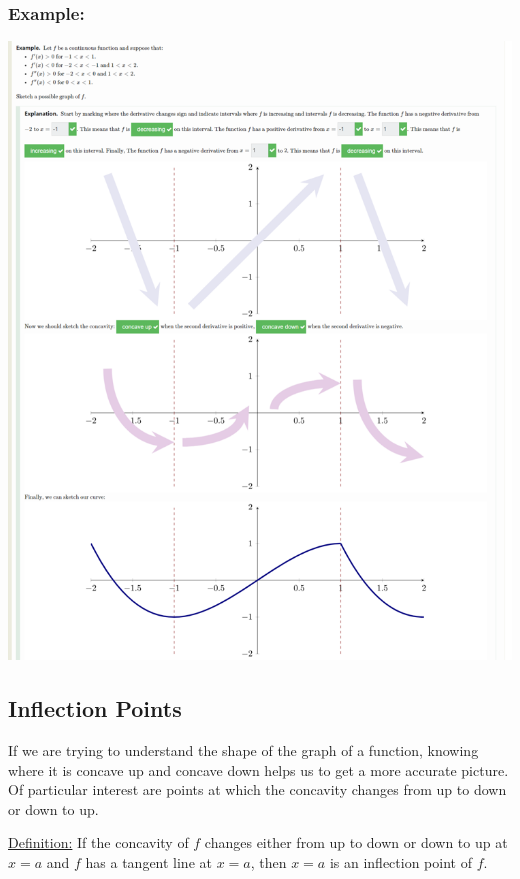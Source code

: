 \documentclass{article}
\begin{document}
\subsubsection*{Example:}
\begin{center}
\begin{minipage}{\linewidth}
    \centering
    \includegraphics[width=1.3\textwidth]{imgs/ex.png}
\end{minipage}
\end{center}

\newpage 
\subsection{Inflection Points}
If we are trying to understand the shape of the graph of a function, knowing where it is concave up and concave down helps us to get a more accurate picture. Of particular interest are points at which the concavity changes from up to down or down to up.

\begin{tcolorbox}[sharp corners=uphill]
\underline{Definition:} If the concavity of $f$ changes either from up to down or down to up at $x=a$ and $f$ has a tangent line at $x=a$, then $x=a$ is an inflection point of $f$.
\end{tcolorbox}
\end{document}
